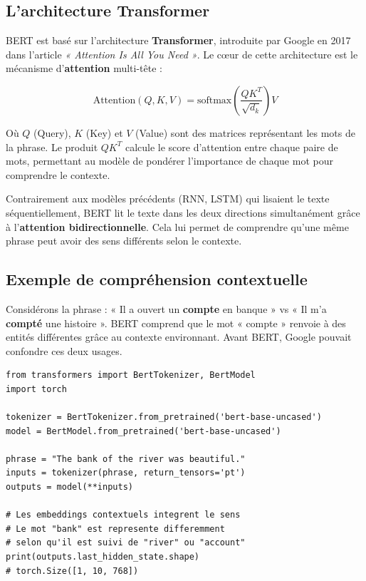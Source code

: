 \documentclass[12pt,a4paper,twoside]{report}
\newcommand{\keyword}[1]{\textbf{\textcolor{googleblue}{#1}}}
\begin{document}
\subsection{L'architecture Transformer}

BERT est basé sur l'architecture \keyword{Transformer}, introduite par Google en 2017 dans l'article \textit{« Attention Is All You Need »}. Le cœur de cette architecture est le mécanisme d'\keyword{attention} multi-tête :

\[
\text{Attention}(Q,K,V) = \text{softmax}\left(\frac{QK^T}{\sqrt{d_k}}\right)V
\]

Où \(Q\) (Query), \(K\) (Key) et \(V\) (Value) sont des matrices représentant les mots de la phrase. Le produit \(QK^T\) calcule le score d'attention entre chaque paire de mots, permettant au modèle de pondérer l'importance de chaque mot pour comprendre le contexte.

Contrairement aux modèles précédents (RNN, LSTM) qui lisaient le texte séquentiellement, BERT lit le texte dans les deux directions simultanément grâce à l'\keyword{attention bidirectionnelle}. Cela lui permet de comprendre qu'une même phrase peut avoir des sens différents selon le contexte.

\subsection{Exemple de compréhension contextuelle}

Considérons la phrase : « Il a ouvert un \textbf{compte} en banque » vs « Il m'a \textbf{compté} une histoire ». BERT comprend que le mot « compte » renvoie à des entités différentes grâce au contexte environnant. Avant BERT, Google pouvait confondre ces deux usages.

\begin{lstlisting}[style=code,caption={Exemple Python : tokenization et attention BERT avec Hugging Face}]
from transformers import BertTokenizer, BertModel
import torch

tokenizer = BertTokenizer.from_pretrained('bert-base-uncased')
model = BertModel.from_pretrained('bert-base-uncased')

phrase = "The bank of the river was beautiful."
inputs = tokenizer(phrase, return_tensors='pt')
outputs = model(**inputs)

# Les embeddings contextuels integrent le sens
# Le mot "bank" est represente differemment
# selon qu'il est suivi de "river" ou "account"
print(outputs.last_hidden_state.shape)
# torch.Size([1, 10, 768])
\end{lstlisting}
\end{document}
